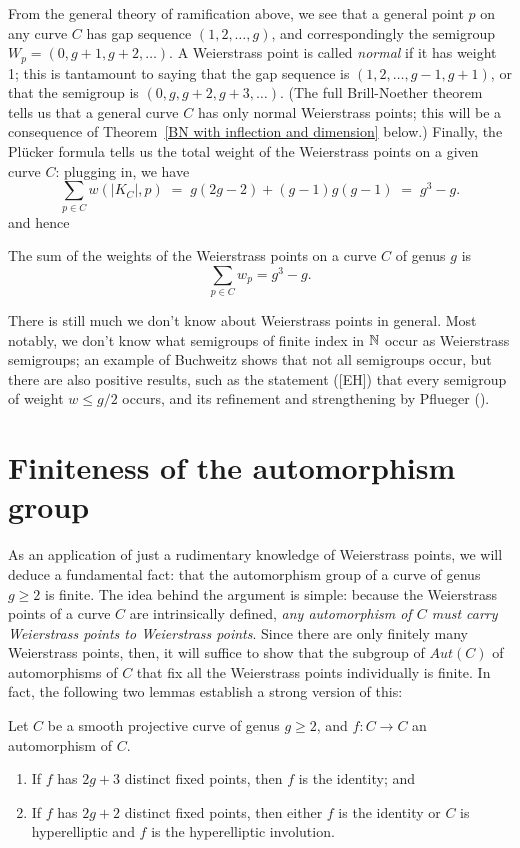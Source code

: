 From the general theory of ramification above, we see that a general point $p$ on any curve $C$ has gap sequence $(1,2,\dots,g)$, and correspondingly the semigroup $W_p = (0, g+1, g+2, \dots)$. A Weierstrass point is called \emph{normal} if it has weight 1; this is tantamount to saying that the gap sequence is $(1,2,\dots,g-1,g+1)$, or that the semigroup is $(0, g, g+2, g+3, \dots)$. (The full Brill-Noether theorem tells us that a general curve $C$ has only normal Weierstrass points; this will be a consequence of Theorem~\ref{BN with inflection and dimension} below.) Finally, the Pl\"ucker formula tells us  the total weight of the Weierstrass points on a given curve $C$: plugging in, we have
$$
\sum_{p \in C} w(|K_C|, p) \; = \; g(2g-2) + (g-1)g(g-1) \; =\;  g^3-g.
$$ 
and hence

\begin{theorem}\label{plucker formula}
The sum of the weights of the Weierstrass points on a curve $C$ of genus $g$ is
$$
\sum_{p \in C} w_p = g^3-g.
$$
\end{theorem}

There is still much we don't know about Weierstrass points in general. Most notably, we don't know what semigroups of finite index in ${\mathbb N}$ occur as Weierstrass semigroups; an example of Buchweitz shows that not all semigroups occur, but there are also positive results, such as the statement ([EH]) that every semigroup of weight $w \leq g/2$ occurs, and its refinement and strengthening by Pflueger (\cite{**}).

\section{Finiteness of the automorphism group}

As an application of just a rudimentary knowledge of Weierstrass points, we will deduce a fundamental fact: that the automorphism group of a curve of genus $g\geq 2$ is finite. The idea behind the argument is simple: because the Weierstrass points of a curve $C$ are intrinsically defined, \emph{any automorphism of $C$ must carry Weierstrass points to Weierstrass points}. Since there are only finitely many Weierstrass points, then, it will suffice to show that the subgroup of $Aut(C)$ of automorphisms of $C$ that fix all the Weierstrass points individually is finite. In fact, the following two lemmas establish a strong version of this:

\begin{lemma}
Let $C$ be a smooth projective curve of genus $g \geq 2$, and $f: C \to C$ an automorphism of $C$.
\begin{enumerate}
\item If $f$ has $2g+3$ distinct fixed points, then $f$ is the identity; and
\item If $f$ has $2g+2$ distinct fixed points, then either $f$ is the identity or $C$ is hyperelliptic and $f$ is the hyperelliptic involution.
\end{enumerate}
\end{lemma}

